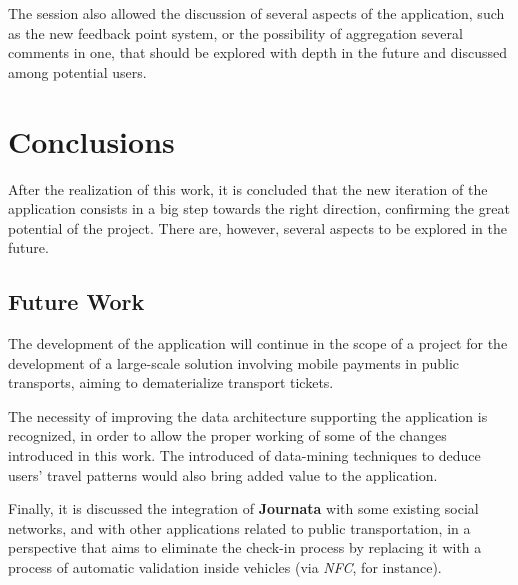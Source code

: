 \documentclass[9pt,a4paper]{extarticle}
\begin{document}
\begin{multicols}{2}
The session also allowed the discussion of several aspects of the application, such as the new feedback point system, or the possibility of aggregation several comments in one, that should be explored with depth in the future and discussed among potential users.

\section{Conclusions}\label{sec:conclui}

After the realization of this work, it is concluded that the new iteration of the application consists in a big step towards the right direction, confirming the great potential of the project. There are, however, several aspects to be explored in the future.

\subsection{Future Work}

The development of the application will continue in the scope of a project for the development of a large-scale solution involving mobile payments in public transports, aiming to dematerialize transport tickets.

The necessity of improving the data architecture supporting the application is recognized, in order to allow the proper working of some of the changes introduced in this work. 
The introduced of data-mining techniques to deduce users' travel patterns would also bring added value to the application.

Finally, it is discussed the integration of \textbf{Journata} with some existing social networks, and with other applications related to public transportation, in a perspective that aims to eliminate the check-in process by replacing it with a process of automatic validation inside vehicles (via \emph{NFC}, for instance).



\end{multicols}
\end{document}
